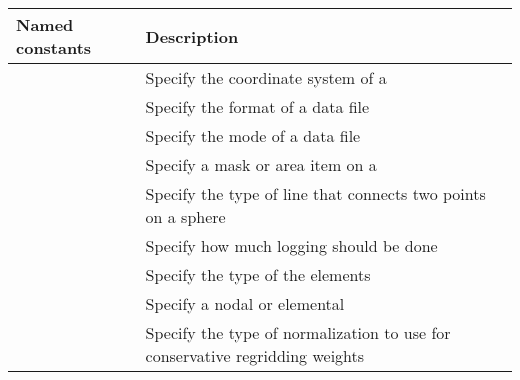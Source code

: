 \documentclass[letterpaper,10pt,english]{sphinxmanual}
\begin{document}
\begin{savenotes}\sphinxattablestart
\centering
\begin{tabulary}{\linewidth}[t]{|T|T|}
\hline
\sphinxstyletheadfamily 
Named constants
&\sphinxstyletheadfamily 
Description
\\
\hline
{\hyperref[\detokenize{CoordSys:ESMF.api.constants.CoordSys}]{}}
&
Specify the coordinate system of a {\hyperref[\detokenize{grid:ESMF.api.grid.Grid}]{}}
\\
\hline
{\hyperref[\detokenize{FileFormat:ESMF.api.constants.FileFormat}]{}}
&
Specify the format of a data file
\\
\hline
{\hyperref[\detokenize{FileMode:ESMF.api.constants.FileMode}]{}}
&
Specify the mode of a data file
\\
\hline
{\hyperref[\detokenize{GridItem:ESMF.api.constants.GridItem}]{}}
&
Specify a mask or area item on a {\hyperref[\detokenize{grid:ESMF.api.grid.Grid}]{}}
\\
\hline
{\hyperref[\detokenize{LineType:ESMF.api.constants.LineType}]{}}
&
Specify the type of line that connects two points on a sphere
\\
\hline
{\hyperref[\detokenize{LogKind:ESMF.api.constants.LogKind}]{}}
&
Specify how much logging should be done
\\
\hline
{\hyperref[\detokenize{MeshElemType:ESMF.api.constants.MeshElemType}]{}}
&
Specify the type of the {\hyperref[\detokenize{mesh:ESMF.api.mesh.Mesh}]{}} elements
\\
\hline
{\hyperref[\detokenize{MeshLoc:ESMF.api.constants.MeshLoc}]{}}
&
Specify a nodal or elemental {\hyperref[\detokenize{mesh:ESMF.api.mesh.Mesh}]{}}
\\
\hline
{\hyperref[\detokenize{NormType:ESMF.api.constants.NormType}]{}}
&
Specify the type of normalization to use for conservative regridding weights
\\

\end{tabulary}
\end{savenotes}
\end{document}
